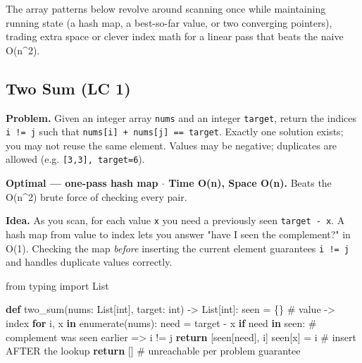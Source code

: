 \documentclass[11pt]{article}
\newenvironment{Shaded}{\begin{snugshade}}{\end{snugshade}}
\newcommand{\BuiltInTok}[1]{\textcolor[rgb]{0.50,0.55,0.55}{#1}}
\newcommand{\CommentTok}[1]{\textcolor[rgb]{0.48,0.49,0.49}{#1}}
\newcommand{\ControlFlowTok}[1]{\textcolor[rgb]{0.99,0.74,0.29}{\textbf{#1}}}
\newcommand{\ImportTok}[1]{\textcolor[rgb]{0.15,0.68,0.38}{#1}}
\newcommand{\KeywordTok}[1]{\textcolor[rgb]{0.81,0.81,0.76}{\textbf{#1}}}
\newcommand{\NormalTok}[1]{\textcolor[rgb]{0.81,0.81,0.76}{#1}}
\newcommand{\OperatorTok}[1]{\textcolor[rgb]{0.81,0.81,0.76}{#1}}
\begin{document}
The array patterns below revolve around scanning once while maintaining running state (a hash map, a best-so-far value, or two converging pointers), trading extra space or clever index math for a linear pass that beats the naive O(n\^{}2).

\subsection{Two Sum (LC 1)}\label{two-sum-lc-1}

\textbf{Problem.} Given an integer array \texttt{nums} and an integer \texttt{target}, return the indices \texttt{i\ !=\ j} such that \texttt{nums{[}i{]}\ +\ nums{[}j{]}\ ==\ target}. Exactly one solution exists; you may not reuse the same element. Values may be negative; duplicates are allowed (e.g. \texttt{{[}3,3{]},\ target=6}).

\textbf{Optimal --- one-pass hash map \(\cdot\) Time O(n), Space O(n).} Beats the O(n\^{}2) brute force of checking every pair.

\textbf{Idea.} As you scan, for each value \texttt{x} you need a previously seen \texttt{target\ -\ x}. A hash map from value to index lets you answer "have I seen the complement?" in O(1). Checking the map \emph{before} inserting the current element guarantees \texttt{i\ !=\ j} and handles duplicate values correctly.


\begin{Shaded}
\begin{Highlighting}[]
\ImportTok{from}\NormalTok{ typing }\ImportTok{import}\NormalTok{ List}

\KeywordTok{def}\NormalTok{ two\_sum(nums: List[}\BuiltInTok{int}\NormalTok{], target: }\BuiltInTok{int}\NormalTok{) }\OperatorTok{{-}\textgreater{}}\NormalTok{ List[}\BuiltInTok{int}\NormalTok{]:}
\NormalTok{    seen }\OperatorTok{=}\NormalTok{ \{\}  }\CommentTok{\# value {-}\textgreater{} index}
    \ControlFlowTok{for}\NormalTok{ i, x }\KeywordTok{in} \BuiltInTok{enumerate}\NormalTok{(nums):}
\NormalTok{        need }\OperatorTok{=}\NormalTok{ target }\OperatorTok{{-}}\NormalTok{ x}
        \ControlFlowTok{if}\NormalTok{ need }\KeywordTok{in}\NormalTok{ seen:          }\CommentTok{\# complement was seen earlier =\textgreater{} i != j}
            \ControlFlowTok{return}\NormalTok{ [seen[need], i]}
\NormalTok{        seen[x] }\OperatorTok{=}\NormalTok{ i               }\CommentTok{\# insert AFTER the lookup}
    \ControlFlowTok{return}\NormalTok{ []                     }\CommentTok{\# unreachable per problem guarantee}
\end{Highlighting}
\end{Shaded}
\end{document}
